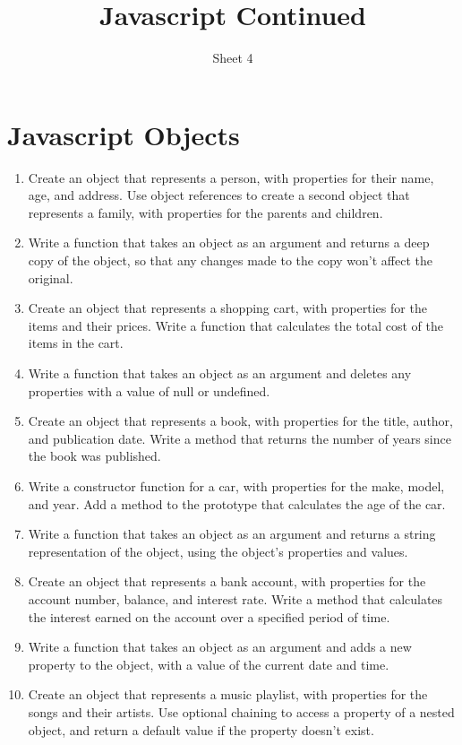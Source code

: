 \documentclass{article}
\title{Javascript Continued}
\author{Sheet 4}
\date{}
\begin{document}
\maketitle


\section{Javascript Objects}

\begin{enumerate}
	\item 	Create an object that represents a person, with properties for their name, age, and address. Use object references to create a second object that represents a family, with properties for the parents and children.

	\item 	Write a function that takes an object as an argument and returns a deep copy of the object, so that any changes made to the copy won't affect the original.

	\item 	Create an object that represents a shopping cart, with properties for the items and their prices. Write a function that calculates the total cost of the items in the cart.

	\item 	Write a function that takes an object as an argument and deletes any properties with a value of null or undefined.

	\item Create an object that represents a book, with properties for the title, author, and publication date. Write a method that returns the number of years since the book was published.

	\item Write a constructor function for a car, with properties for the make, model, and year. Add a method to the prototype that calculates the age of the car.

	\item Write a function that takes an object as an argument and returns a string representation of the object, using the object's properties and values.

	\item 	Create an object that represents a bank account, with properties for the account number, balance, and interest rate. Write a method that calculates the interest earned on the account over a specified period of time.

	\item Write a function that takes an object as an argument and adds a new property to the object, with a value of the current date and time.

	\item Create an object that represents a music playlist, with properties for the songs and their artists. Use optional chaining to access a property of a nested object, and return a default value if the property doesn't exist.
\end{enumerate}
\end{document}
